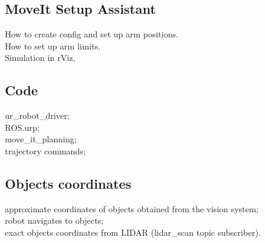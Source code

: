 \subsection{MoveIt Setup Assistant}
How to create config and set up arm positions.\\
How to set up arm limits.\\
Simulation in rViz.\\

\subsection{Code}
ur\_robot\_driver;\\
ROS.urp;\\
move\_it\_planning;\\
trajectory commands;\\

\subsection{Objects coordinates}
approximate coordinates of objects obtained from the vision system; \\
robot navigates to objects; \\
exact objects coordinates from LIDAR (lidar\_scan topic subscriber).\\










